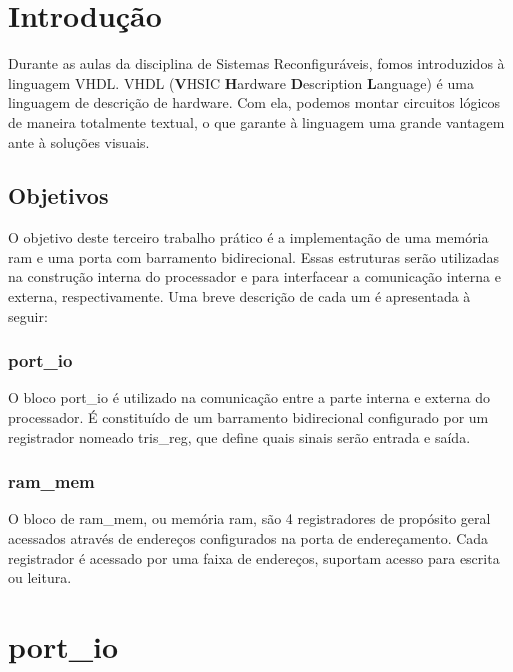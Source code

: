 \documentclass{article}
\begin{document}


\newpage
\thispagestyle{empty}
\tableofcontents

\newpage
\large %

\section{Introdução}

Durante as aulas da disciplina de Sistemas Reconfiguráveis, fomos introduzidos à linguagem VHDL. VHDL (\textbf{V}HSIC \textbf{H}ardware \textbf{D}escription \textbf{L}anguage) é uma linguagem de descrição de hardware. Com ela, podemos montar circuitos lógicos de maneira totalmente textual, o que garante à linguagem uma grande vantagem ante à soluções visuais.

\subsection{Objetivos}

O objetivo deste terceiro trabalho prático é a implementação de uma memória ram e uma porta com barramento bidirecional. Essas estruturas serão utilizadas na construção interna do processador e para interfacear a comunicação interna e externa, respectivamente. Uma breve descrição de cada um é apresentada à seguir:

\subsubsection{port\_io}

O bloco port\_io é utilizado na comunicação entre a parte interna e externa do processador. É constituído de um barramento bidirecional configurado por um registrador nomeado tris\_reg, que define quais sinais serão entrada e saída.

\subsubsection{ram\_mem}

O bloco de ram\_mem, ou memória ram, são 4 registradores de propósito geral acessados através de endereços configurados na porta de endereçamento. Cada registrador é acessado por uma faixa de endereços, suportam acesso para escrita ou leitura.

\newpage

\section{port\_io}
\end{document}
